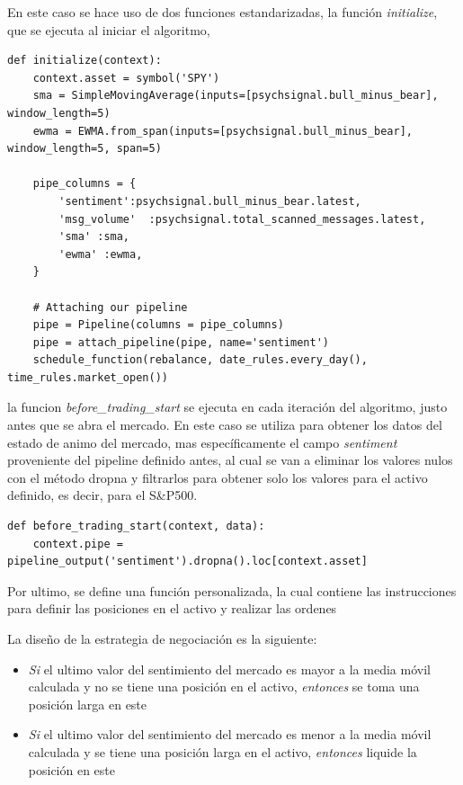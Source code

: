 \documentclass[a4paper, 11pt, twocolumn]{article}
\begin{document}
En este caso se hace uso de dos funciones estandarizadas, la función \textit{initialize}, que se ejecuta al iniciar el algoritmo, 

\begin{lstlisting}
def initialize(context):
    context.asset = symbol('SPY')
    sma = SimpleMovingAverage(inputs=[psychsignal.bull_minus_bear], window_length=5)
    ewma = EWMA.from_span(inputs=[psychsignal.bull_minus_bear], window_length=5, span=5)
    
    pipe_columns = {
        'sentiment':psychsignal.bull_minus_bear.latest,
        'msg_volume'  :psychsignal.total_scanned_messages.latest,
        'sma' :sma,
        'ewma' :ewma,
    }
    
    # Attaching our pipeline
    pipe = Pipeline(columns = pipe_columns)
    pipe = attach_pipeline(pipe, name='sentiment')
    schedule_function(rebalance, date_rules.every_day(), time_rules.market_open())
\end{lstlisting}

la funcion \textit{before\_trading\_start} se ejecuta en cada iteración del algoritmo, justo antes que se abra el mercado. En este caso se utiliza para obtener los datos del estado de animo del mercado, mas específicamente el campo \textit{sentiment} proveniente del pipeline definido antes, al cual se van a eliminar los valores nulos con el método dropna y filtrarlos para obtener solo los valores para el activo definido, es decir, para el S\&P500. 

\begin{lstlisting}
def before_trading_start(context, data):
    context.pipe = pipeline_output('sentiment').dropna().loc[context.asset]
\end{lstlisting}

Por ultimo, se define una función personalizada, la cual contiene las instrucciones para definir las posiciones en el activo y realizar las ordenes

La diseño de la estrategia de negociación es la siguiente:

\begin{itemize}
    \item \textit{Si} el ultimo valor del sentimiento del mercado es mayor a la media móvil calculada y no se tiene una posición en el activo, \textit{entonces} se toma una posición larga en este
    \item \textit{Si} el ultimo valor del sentimiento del mercado es menor a la media móvil calculada y se tiene una posición larga en el activo, \textit{entonces} liquide la posición en este
\end{itemize}
\end{document}
